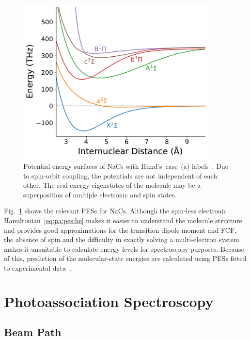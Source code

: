\begin{figure}
  \centering
  \includegraphics[width=0.9\textwidth]{figures/pa_pes.pdf}
  \caption[NaCs potential energy surfaces]{
    Potential energy surfaces of NaCs with Hund's~case~(a) labels~\cite{
      docenko_coupling_2006,zaharova_solution_2009,grochola_spin-forbidden_2011,
      grochola_investigation_2010}.
    Due to spin-orbit coupling, the potentials are not independent of each other.
    The real energy eigenstates of the molecule may be a superposition of multiple
    electronic and spin states.
    \label{fig:pa:pes}}
\end{figure}

Fig.~\ref{fig:pa:pes} shows the relevant PESs for $\mathrm{NaCs}$.
Although the spin-less electronic Hamiltonian~\ref{eq:pa:pes:he} makes it easier
to understand the molecule structure and provides good approximations for the
transition dipole moment and FCF, the absence of spin and the difficulty in exactly solving
a multi-electron system makes it unsuitable to calculate energy levels
for spectroscopy purposes.
Because of this, prediction of the molecular-state energies are calculated using
PESs fitted to experimental data~\cite{docenko_coupling_2006,zaharova_solution_2009,
  grochola_spin-forbidden_2011,grochola_investigation_2010}.

\section{Photoassociation Spectroscopy}
\label{ch:pa:pa}

\subsection{Beam Path}
\label{ch:pa:beampath}

